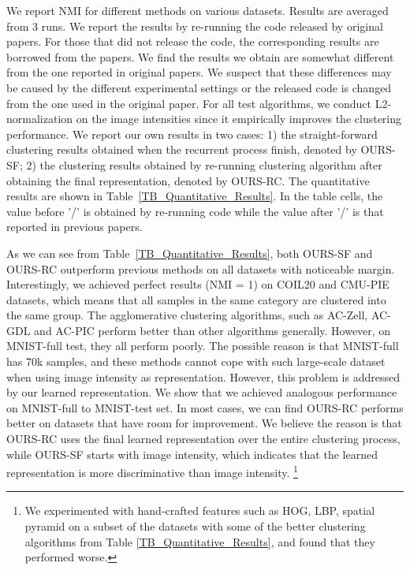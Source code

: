 \documentclass[10pt,twocolumn,letterpaper]{article}
\begin{document}
We report NMI for different methods on various datasets. {Results are averaged from 3 runs}. We report the results by re-running the code released by original papers. For those that did not release the code, the corresponding results are borrowed from {the papers}. We find the results we obtain are somewhat different from the one reported in original papers. We suspect that these differences may be caused by the different experimental settings or the released code is changed from the one used in the original paper. For all test algorithms, we conduct L2-normalization on the image intensities since it empirically improves the clustering performance. We report our own results in two cases: 1) the straight-forward clustering results obtained when the recurrent process finish, denoted by OURS-SF; 2) the clustering results obtained by re-running clustering algorithm after obtaining the final representation, denoted by OURS-RC. The quantitative results are shown in Table~\ref{TB_Quantitative_Results}. In the table cells, the value before '/' is obtained by re-running code while the value after '/' is that reported in previous papers. 

As we can see from Table~\ref{TB_Quantitative_Results}, both OURS-SF and OURS-RC outperform previous methods on all datasets with noticeable margin. {Interestingly}, we achieved perfect results (NMI = 1) on COIL20 and CMU-PIE datasets, which means that all samples in the same category are clustered into the same group. {The agglomerative clustering algorithms, such as AC-Zell, AC-GDL and AC-PIC perform better than other algorithms generally. However, on MNIST-full test, they all perform {poorly}. The possible reason is that MNIST-full has 70k samples, and these methods cannot cope with such large-scale dataset when using image intensity as representation. However, this problem is addressed by our learned representation. {We show} that we achieved {analogous} performance on MNIST-full to MNIST-test set}. In most cases, we can find OURS-RC performs better on datasets that have room for improvement. {We believe the reason is that} OURS-RC uses the final learned representation over the entire clustering process, while OURS-SF starts with {image intensity}, which indicates that the learned representation is more discriminative than {image intensity}.  
\footnote{We experimented with hand-crafted features such as HOG, LBP, spatial pyramid on a subset of the datasets with some of the better clustering algorithms from Table \ref{TB_Quantitative_Results}, and found that they performed worse.}
\end{document}
